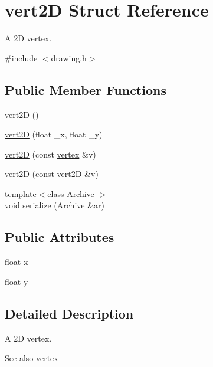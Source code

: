\hypertarget{structvert2_d}{}\section{vert2D Struct Reference}
\label{structvert2_d}


A 2D vertex.  




{\ttfamily \#include $<$drawing.\+h$>$}

\subsection*{Public Member Functions}
\begin{DoxyCompactItemize}
\item 
\hyperlink{structvert2_d_a116d6e9a4e887bb51c06ac9b730e275b}{vert2D} ()
\item 
\hyperlink{structvert2_d_a0fdba75ac4eee52c2c45f539563bb206}{vert2D} (float \+\_\+x, float \+\_\+y)
\item 
\hyperlink{structvert2_d_a28e182e4cc2a96428c27564d452bf6d0}{vert2D} (const \hyperlink{structvertex}{vertex} \&v)
\item 
\hyperlink{structvert2_d_a2b2f41c598c3d331429370df13b1ff57}{vert2D} (const \hyperlink{structvert2_d}{vert2D} \&v)
\item 
{\footnotesize template$<$class Archive $>$ }\\void \hyperlink{structvert2_d_a49ebe8620fcc0a8c4c597a843c1ae421}{serialize} (Archive \&ar)
\end{DoxyCompactItemize}
\subsection*{Public Attributes}
\begin{DoxyCompactItemize}
\item 
float \hyperlink{structvert2_d_ac76618e2458c9d2c19e24e3e5ef92eb9}{x}
\item 
float \hyperlink{structvert2_d_a9d26c64b1b08d9d2c00ef1d94a17b923}{y}
\end{DoxyCompactItemize}


\subsection{Detailed Description}
A 2D vertex. 

\begin{DoxySeeAlso}{See also}
\hyperlink{structvertex}{vertex} 
\end{DoxySeeAlso}


